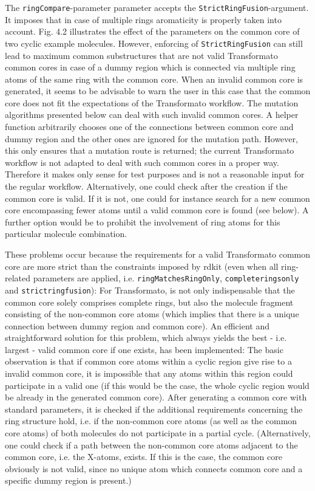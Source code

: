 The \texttt{ringCompare}-parameter parameter accepts the \texttt{StrictRingFusion}-argument.
It imposes that in case of multiple rings aromaticity is properly
taken into account. Fig. 4.2 illustrates the effect of the parameters
on the common core of two cyclic example molecules. However, enforcing
of \texttt{StrictRingFusion} can still lead to maximum common substructures
that are not valid Transformato common cores in case of a dummy region
which is connected via multiple ring atoms of the same ring with the common
core. 
When an invalid common core is generated, it seems to be advisable to warn the user in this case that the common core does not fit the expectations of the Transformato workflow. 
The mutation algorithms presented below can deal with such invalid common cores. A helper function arbitrarily chooses one of the connections between common core and dummy region and the other ones are ignored for the mutation path. However, this only ensures that a mutation route is returned; the current Transformato workflow is not adapted to deal with such common cores in a proper way. Therefore it makes only sense for test purposes and is not a reasonable input for the regular workflow.
Alternatively, one could check after the creation if the common core is valid. If
it is not, one could for instance search for a new common core encompassing fewer
atoms until a valid common core is found (see below). A further option would be to prohibit the involvement of ring atoms for this particular molecule combination.

These problems occur because the requirements for a valid Transformato common core are more strict than the constraints imposed by rdkit  (even when all ring-related parameters are applied, i.e. \texttt{ringMatchesRingOnly}, \texttt{completeringsonly} and \texttt{strictringfusion}): For Transformato, is not only indispensable that the common core solely comprises complete rings, but also the molecule fragment consisting of the non-common core atoms (which implies that there is a unique connection between dummy region and common core).
An efficient and straightforward solution for this problem, which always yields the best - i.e. largest - valid common core if one exists, has been implemented:
The basic observation is that if common core atoms within a cyclic region give rise to a invalid common core, it is impossible that any atoms within this region could participate in a valid one (if this would be the case, the whole cyclic region would be already in the generated common core).
After generating a common core with standard parameters, it is checked if the additional requirements concerning the ring structure hold, i.e. if the non-common core atoms (as well as the common core atoms) of both molecules do not participate in a partial cycle.
(Alternatively, one could check if a path between the non-common core atoms adjacent to the common core, i.e. the X-atoms, exists. If this is the case, the common core obviously is not valid, since no unique atom which connects common core and a specific dummy region is present.)





